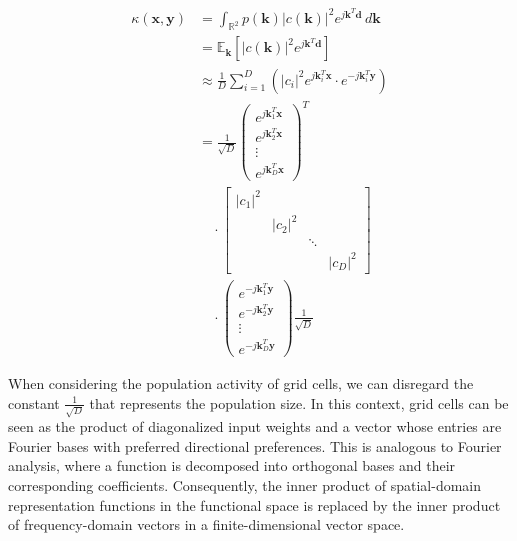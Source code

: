 \documentclass[letterpaper]{article} %
\begin{document}
\begin{equation}
\begin{aligned}
\kappa(\boldsymbol{x}, \boldsymbol{y}) 
&= \int_{\mathbb{R}^2} p(\boldsymbol{k}) |c(\boldsymbol{k})|^2 e^{j \boldsymbol{k}^T \boldsymbol{d}} \, d\boldsymbol{k} \\
&= \mathbb{E}_{\boldsymbol{k}} \left[ |c(\boldsymbol{k})|^2 e^{j \boldsymbol{k}^T \boldsymbol{d}} \right] \\
&\approx \frac{1}{D} \sum_{i=1}^{D} \left( |c_i|^2 e^{j \boldsymbol{k}_i^T \boldsymbol{x}} \cdot e^{-j \boldsymbol{k}_i^T \boldsymbol{y}} \right) \\
&= \frac{1}{\sqrt{D}} 
\left( \begin{array}{c}
e^{j \boldsymbol{k}_1^T \boldsymbol{x}} \\
e^{j \boldsymbol{k}_2^T \boldsymbol{x}} \\
\vdots \\
e^{j \boldsymbol{k}_D^T \boldsymbol{x}}
\end{array} \right)^T \\
&\quad \cdot
\begin{bmatrix}
|c_1|^2 & & & \\
& |c_2|^2 & & \\
& & \ddots & \\
& & & |c_D|^2
\end{bmatrix} \\
&\quad \cdot
\left( \begin{array}{c}
e^{-j \boldsymbol{k}_1^T \boldsymbol{y}} \\
e^{-j \boldsymbol{k}_2^T \boldsymbol{y}} \\
\vdots \\
e^{-j \boldsymbol{k}_D^T \boldsymbol{y}}
\end{array} \right)
\frac{1}{\sqrt{D}}
\end{aligned}
\end{equation}

When considering the population activity of grid cells, we can disregard the constant \(\frac{1}{\sqrt{D}}\) that represents the population size. In this context, grid cells can be seen as the product of diagonalized input weights and a vector whose entries are Fourier bases with preferred directional preferences. This is analogous to Fourier analysis, where a function is decomposed into orthogonal bases and their corresponding coefficients. Consequently, the inner product of spatial-domain representation functions in the functional space is replaced by the inner product of frequency-domain vectors in a finite-dimensional vector space.
\end{document}
